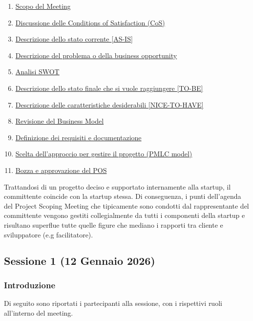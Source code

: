 \documentclass[11pt,a4paper]{article}
\providecommand{\tightlist}{\setlength{\itemsep}{0pt}\setlength{\parskip}{0pt}}
\begin{document}
\begin{enumerate}
\tightlist
\item \hyperref[h.c1v1qx93u0sn]{Scopo del Meeting}
\item \hyperref[h.uicl3o5agswu]{Discussione delle Conditions of Satisfaction (CoS)}
\item \hyperref[h.meezg5rv8de5]{Descrizione dello stato corrente {[}AS-IS{]}}
\item \hyperref[h.2j79oh93vnfk]{Descrizione del problema o della business opportunity}
\item \hyperref[h.sfbyyd4btbgl]{Analisi SWOT}
\item \hyperref[h.6zws62i5chql]{Descrizione dello stato finale che si vuole raggiungere {[}TO-BE{]}}
\item \hyperref[h.x05f3pi4qn4r]{Descrizione delle caratteristiche desiderabili {[}NICE-TO-HAVE{]}}
\item \hyperref[h.xaxa9fyx61hd]{Revisione del Business Model}
\item \hyperref[h.v5zosoywpqxe]{Definizione dei requisiti e documentazione}
\item \hyperref[h.ce7nvwrbo5wp]{Scelta dell’approccio per gestire il progetto (PMLC model)}
\item \hyperref[h.5yjx4r1o32t0]{Bozza e approvazione del POS}
\end{enumerate}

{}

{Trattandosi di un progetto deciso e supportato internamente alla startup, il committente coincide con la startup stessa. Di conseguenza, i punti dell’agenda del Project Scoping Meeting che tipicamente sono condotti dal rappresentante del committente vengono gestiti collegialmente da tutti i componenti della startup e risultano superflue tutte quelle figure che mediano i rapporti tra cliente e sviluppatore (e.g facilitatore).}

\subsection{\texorpdfstring{{Sessione 1 (12 Gennaio 2026)}}{Sessione 1 (12 Gennaio 2026)}}\label{h.ssszefuz2w34}

\subsubsection{\texorpdfstring{{Introduzione}}{Introduzione}}\label{h.v9t6pdgpwtvv}

{Di seguito sono riportati i partecipanti alla sessione, con i rispettivi ruoli all’interno del meeting.}
\end{document}
